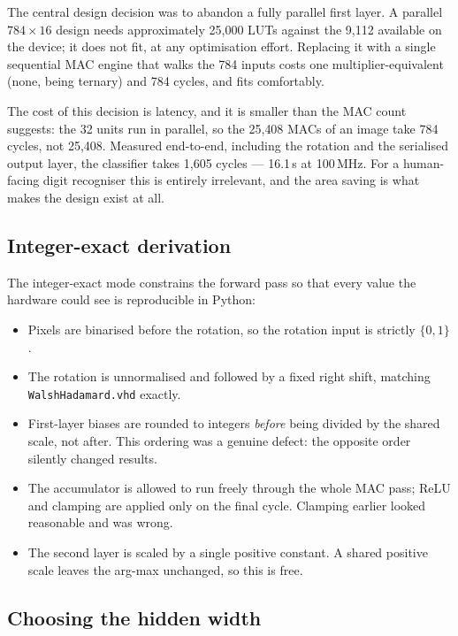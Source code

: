 \documentclass[11pt,a4paper]{article}
\begin{document}
The central design decision was to abandon a fully parallel first layer. A
parallel $784 \times 16$ design needs approximately 25{,}000 LUTs against the
9{,}112 available on the device; it does not fit, at any optimisation effort.
Replacing it with a single sequential MAC engine that walks the 784 inputs costs
one multiplier-equivalent (none, being ternary) and 784 cycles, and fits
comfortably.

The cost of this decision is latency, and it is smaller than the MAC count
suggests: the 32 units run in parallel, so the 25{,}408 MACs of an image take
784 cycles, not 25{,}408. Measured end-to-end, including the rotation and the
serialised output layer, the classifier takes 1{,}605 cycles --- 16.1\,\textmu s
at 100\,MHz. For a human-facing digit recogniser this is entirely irrelevant,
and the area saving is what makes the design exist at all.

\subsection{Integer-exact derivation}

The integer-exact mode constrains the forward pass so that every value the
hardware could see is reproducible in Python:

\begin{itemize}[leftmargin=*]
\item Pixels are binarised before the rotation, so the rotation input is strictly
      $\{0,1\}$.
\item The rotation is unnormalised and followed by a fixed right shift, matching
      \texttt{WalshHadamard.vhd} exactly.
\item First-layer biases are rounded to integers \emph{before} being divided by
      the shared scale, not after. This ordering was a genuine defect: the
      opposite order silently changed results.
\item The accumulator is allowed to run freely through the whole MAC pass; ReLU
      and clamping are applied only on the final cycle. Clamping earlier looked
      reasonable and was wrong.
\item The second layer is scaled by a single positive constant. A shared positive
      scale leaves the arg-max unchanged, so this is free.
\end{itemize}

\subsection{Choosing the hidden width}
\label{sec:width}
\end{document}
